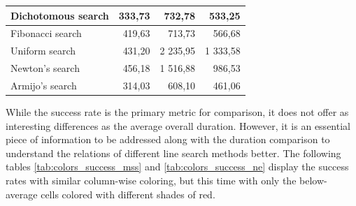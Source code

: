\documentclass[english, 12pt, a4paper, sci, utf8, a-1b, online, table]{aaltothesis}
\begin{document}
\begin{table}[H]
\begin{tabular}{|l|r|r|r|}
    Dichotomous search                                                         & \cellcolor[HTML]{74C79E}333,73                            & \cellcolor[HTML]{C9E9D9}732,78                           & \cellcolor[HTML]{74C79E}533,25                                \\ \hline
    Fibonacci search                                                           & 419,63                                                    & \cellcolor[HTML]{C9E9D9}713,73                           & \cellcolor[HTML]{A5DABF}566,68                                \\ \hline
    Uniform search                                                             & 431,20                                                    & \cellcolor[HTML]{E67B73}2 235,95                         & \cellcolor[HTML]{EDA19C}1 333,58                              \\ \hline
    Newton's search                                                             & 456,18                                                    & \cellcolor[HTML]{EDA19C}1 516,88                         & \cellcolor[HTML]{F7D3D0}986,53                                \\ \hline
    Armijo's search                                                              & \cellcolor[HTML]{57BB89}314,03                            & \cellcolor[HTML]{57BB89}608,10                           & \cellcolor[HTML]{57BB89}461,06                                \\ \hline
    \end{tabular}
\end{table}


While the success rate is the primary metric for comparison, it does not offer as interesting differences as the average overall duration. However, it is an essential piece of information to be addressed along with the duration comparison to understand the relations of different line search methods better. The following tables \ref{tab:colors_success_mss} and \ref{tab:colors_success_ne} display the success rates with similar column-wise coloring, but this time with only the below-average cells colored with different shades of red.
\end{document}
